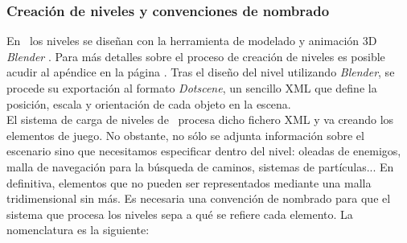 \subsubsection{Creación de niveles y convenciones de nombrado}

En \juego\ los niveles se diseñan con la herramienta de modelado y animación
3D \textit{Blender} \cite{hess09}. Para más detalles sobre el proceso
de creación de niveles es posible acudir al apéndice 
en la página \pageref{chap:manual}. Tras el diseño del nivel utilizando
\textit{Blender}, se procede su exportación al formato \textit{Dotscene},
un sencillo XML que define la posición, escala y orientación de cada
objeto en la escena.\\

El sistema de carga de niveles de \juego\ procesa dicho fichero XML y va
creando los elementos de juego. No obstante, no sólo se adjunta información
sobre el escenario sino que necesitamos especificar dentro del nivel: oleadas
de enemigos, malla de navegación para la búsqueda de caminos, sistemas de
partículas... En definitiva, elementos que no pueden ser representados mediante
una malla tridimensional sin más. Es necesaria una convención de nombrado
para que el sistema que procesa los niveles sepa a qué se refiere cada
elemento. La nomenclatura es la siguiente:

